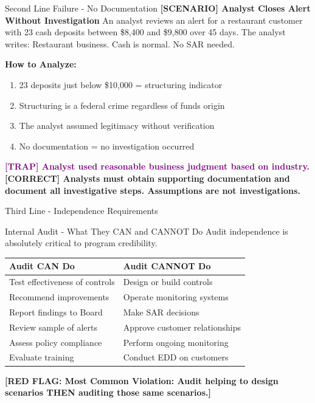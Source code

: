 \documentclass[11pt,a4paper]{beamer}
\newcommand{\trap}[1]{\textcolor{purple}{\textbf{[TRAP] #1}}}
\newcommand{\correct}[1]{\textcolor{green!50!black}{\textbf{[CORRECT] #1}}}
\newcommand{\scenario}[1]{\textcolor{blue!70!black}{\textbf{[SCENARIO] #1}}}
\newcommand{\redflag}[1]{\textcolor{red!80!black}{\textbf{[RED FLAG: #1]}}}
\begin{document}
	\begin{frame}{Second Line Failure - No Documentation}
		\scenario{Analyst Closes Alert Without Investigation}
		An analyst reviews an alert for a restaurant customer with 23 cash deposits between \$8,400 and \$9,800 over 45 days. The analyst writes: Restaurant business. Cash is normal. No SAR needed.
		
		\vspace{0.1cm}
		\textbf{How to Analyze:}
		\begin{enumerate}
			\item 23 deposits just below \$10,000 = structuring indicator
			\item Structuring is a federal crime regardless of funds origin
			\item The analyst assumed legitimacy without verification
			\item No documentation = no investigation occurred
		\end{enumerate}
		\trap{Analyst used reasonable business judgment based on industry.}
		\correct{Analysts must obtain supporting documentation and document all investigative steps. Assumptions are not investigations.}
	\end{frame}
	
	\begin{frame}{Third Line - Independence Requirements}
		\begin{block}{Internal Audit - What They CAN and CANNOT Do}
			Audit independence is absolutely critical to program credibility.
		\end{block}
		\begin{tabular}{p{}|p{}}
			\hline
			\rowcolor{lightgray}
			\textbf{Audit CAN Do} & \textbf{Audit CANNOT Do} \\
			\hline
			Test effectiveness of controls & Design or build controls \\
			Recommend improvements & Operate monitoring systems \\
			Report findings to Board & Make SAR decisions \\
			Review sample of alerts & Approve customer relationships \\
			Assess policy compliance & Perform ongoing monitoring \\
			Evaluate training & Conduct EDD on customers \\
			\hline
		\end{tabular}
		\redflag{Most Common Violation: Audit helping to design scenarios THEN auditing those same scenarios.}
	\end{frame}
	
\end{document}
